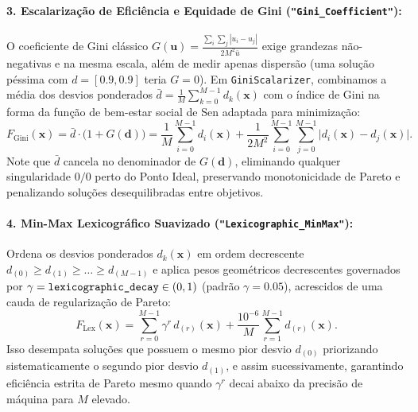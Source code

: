 \documentclass[11pt,a4paper]{article}
\begin{document}
\paragraph{3. Escalarização de Eficiência e Equidade de Gini (\texttt{"Gini\_Coefficient"}):}
O coeficiente de Gini clássico $G(\mathbf{u}) = \frac{\sum_i \sum_j |u_i - u_j|}{2 M^2 \bar{u}}$ exige grandezas não-negativas e na mesma escala, além de medir apenas dispersão (uma solução péssima com $d = [0.9, 0.9]$ teria $G=0$). Em \texttt{GiniScalarizer}, combinamos a média dos desvios ponderados $\bar{d} = \frac{1}{M}\sum_{k=0}^{M-1} d_k(\mathbf{x})$ com o índice de Gini na forma da função de bem-estar social de Sen adaptada para minimização:
\begin{equation}
  F_{\text{Gini}}(\mathbf{x}) = \bar{d}\cdot\big(1 + G(\mathbf{d})\big)
  = \frac{1}{M}\sum_{i=0}^{M-1} d_i(\mathbf{x})
  + \frac{1}{2 M^2} \sum_{i=0}^{M-1}\sum_{j=0}^{M-1} \big|d_i(\mathbf{x}) - d_j(\mathbf{x})\big|.
  \label{eq:gini}
\end{equation}
Note que $\bar{d}$ cancela no denominador de $G(\mathbf{d})$, eliminando qualquer singularidade $0/0$ perto do Ponto Ideal, preservando monotonicidade de Pareto e penalizando soluções desequilibradas entre objetivos.

\paragraph{4. Min-Max Lexicográfico Suavizado (\texttt{"Lexicographic\_MinMax"}):}
Ordena os desvios ponderados $d_k(\mathbf{x})$ em ordem decrescente $d_{(0)} \ge d_{(1)} \ge \dots \ge d_{(M-1)}$ e aplica pesos geométricos decrescentes governados por $\gamma = \text{\texttt{lexicographic\_decay}} \in (0,1)$ (padrão $\gamma = 0.05$), acrescidos de uma cauda de regularização de Pareto:
\begin{equation}
  F_{\text{Lex}}(\mathbf{x}) = \sum_{r=0}^{M-1} \gamma^{r} \, d_{(r)}(\mathbf{x})
  + \frac{10^{-6}}{M} \sum_{r=1}^{M-1} d_{(r)}(\mathbf{x}).
  \label{eq:lex}
\end{equation}
Isso desempata soluções que possuem o mesmo pior desvio $d_{(0)}$ priorizando sistematicamente o segundo pior desvio $d_{(1)}$, e assim sucessivamente, garantindo eficiência estrita de Pareto mesmo quando $\gamma^r$ decai abaixo da precisão de máquina para $M$ elevado.
\end{document}
